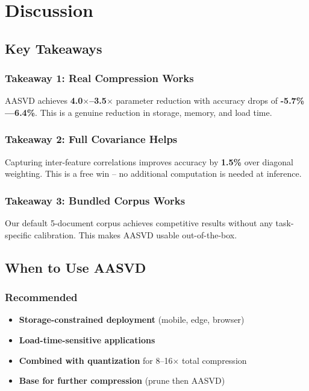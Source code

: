 \section{Discussion}

\subsection{Key Takeaways}

\subsubsection{Takeaway 1: Real Compression Works}

AASVD achieves \textbf{4.0$\times$--3.5$\times$} parameter reduction with 
accuracy drops of \textbf{-5.7\%---6.4\%}. This is a genuine reduction 
in storage, memory, and load time.

\subsubsection{Takeaway 2: Full Covariance Helps}

Capturing inter-feature correlations improves accuracy by 
\textbf{1.5\%} over diagonal weighting. This is a free win -- no additional 
computation is needed at inference.

\subsubsection{Takeaway 3: Bundled Corpus Works}

Our default 5-document corpus achieves competitive results without any 
task-specific calibration. This makes AASVD usable out-of-the-box.

\subsection{When to Use AASVD}

\subsubsection{Recommended}

\begin{itemize}
\item \textbf{Storage-constrained deployment} (mobile, edge, browser)
\item \textbf{Load-time-sensitive applications}
\item \textbf{Combined with quantization} for 8--16$\times$ total compression
\item \textbf{Base for further compression} (prune then AASVD)

\end{itemize}
